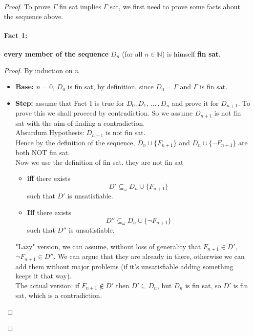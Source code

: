 \documentclass[11pt]{article}
\begin{document}
\begin{proof}
		To prove $\Gamma$ fin sat implies $\Gamma$ sat, we first need to prove some facts about the sequence above.\\
		
		\newpage
		
		\paragraph{Fact 1:} \textbf{every member of the sequence} $D_n$ (for all $n \in \mathbb{N}$) is himself \textbf{fin sat}.
		
		\begin{proof}
			By induction on $n$
			\begin{itemize}
				\item \textbf{Base:} $n=0$, $D_0$ is fin sat, by definition, since $D_0 = \Gamma$ and $\Gamma$ is fin sat.
				
				\item \textbf{Step:} assume that Fact 1 is true for $D_0, D_1, \, ... \, , D_n$ and prove it for $D_{n+1}$. To prove this we shall proceed by contradiction. So we assume $D_{n+1}$ is not fin sat with the aim of finding a contradiction. \\
				
				Absurdum Hypothesis: $D_{n+1}$ is not fin sat. \\
				
				Hence by the definition of the sequence, $D_n \cup \{F_{n+1}\}$ and $D_n \cup \{\neg F_{n+1}\}$ are both NOT fin sat.\\
				
				Now we use the definition of fin sat, they are not fin sat 
				\begin{itemize}[label=]
					\item \textbf{iff} there exists 
					$$ D' \subseteq_\omega D_{n} \cup \{F_{n+1}\} $$
					such that $D'$ is unsatisfiable.\\
					
					\item \textbf{Iff} there exists 
					$$ D'' \subseteq_\omega D_{n} \cup \{ \neg F_{n+1}\} $$
					such that $D''$ is unsatisfiable.\\
				\end{itemize}
				
				"Lazy" version, we can assume, without loss of generality that $F_{n+1} \in D'$, $\neg F_{n+1} \in D''$. We can argue that they are already in there, otherwise we can add them without major problems (if it's unsatisfiable adding something keeps it that way).\\
				The actual version: if $F_{n+1} \notin D'$ then $D' \subseteq D_n$, but $D_n$ is fin sat, so $D'$ is fin sat, which is a contradiction.\\
				

\end{itemize}
\end{proof}
\end{proof}
\end{document}
